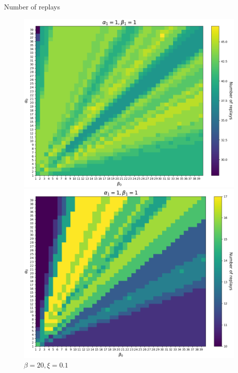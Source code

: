 \documentclass{article}
\begin{document}
\clearpage

Number of replays 

\begin{figure}[ht!]
    \begin{minipage}{0.49\textwidth}
        \centering
        \includegraphics[width=1\textwidth]{../../../../bandit/data/convergence/num_replays/temp20/num_horizon4_alpha1_beta1_xi0001_temp20.png}
        \caption{$\beta=20, \xi=0.001$}
    \end{minipage}%
    \begin{minipage}{0.49\textwidth}
        \centering
        \includegraphics[width=1\textwidth]{../../../../bandit/data/convergence/num_replays/temp20/num_horizon4_alpha1_beta1_xi01_temp20.png}
        \caption{$\beta=20, \xi=0.1$}
    \end{minipage}
\end{figure}
\end{document}
